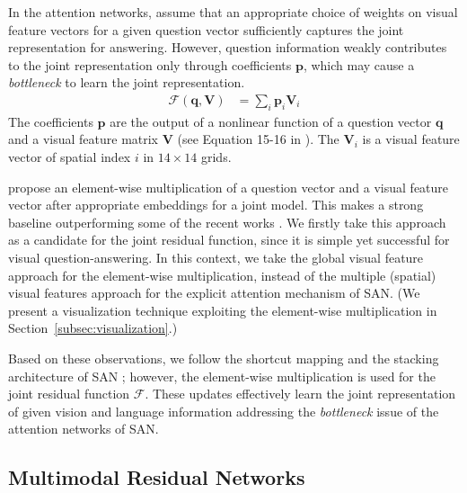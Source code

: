 \documentclass{article}
\newcommand{\vq}[0]{\mathbf{q}}
\newcommand{\vp}[0]{\mathbf{p}}
\newcommand{\mV}[0]{\mathbf{V}}
\begin{document}
In the attention networks, \citet{Yang2015} assume that an appropriate choice of weights on visual feature vectors for a given question vector sufficiently captures the joint representation for answering. However, question information weakly contributes to the joint representation only through coefficients $\vp$, which may cause a \textit{bottleneck} to learn the joint representation. \begin{align}
   \label{eq:san}
   \mathcal{F}(\vq,\mV) &= \sum_{i} \vp_{i} \mV_i
\end{align}
The coefficients $\vp$ are the output of a nonlinear function of a question vector $\vq$ and a visual feature matrix $\mV$ (see Equation 15-16 in \citet{Yang2015}). The $\mV_i$ is a visual feature vector of spatial index $i$ in $14 \times 14$ grids.

\citet{Lu2015} propose an element-wise multiplication of a question vector and a visual feature vector after appropriate embeddings for a joint model. This makes a strong baseline outperforming some of the recent works \cite{Noh2015,Andreas2016}. We firstly take this approach as a candidate for the joint residual function, since it is simple yet successful for visual question-answering. In this context, we take the global visual feature approach for the element-wise multiplication, instead of the multiple (spatial) visual features approach for the explicit attention mechanism of SAN. (We present a visualization technique exploiting the element-wise multiplication in Section~\ref{subsec:visualization}.)

Based on these observations, we follow the shortcut mapping and the stacking architecture of SAN \cite{Yang2015}; however, the element-wise multiplication is used for the joint residual function $\mathcal{F}$. These updates effectively learn the joint representation of given vision and language information addressing the \textit{bottleneck} issue of the attention networks of SAN.

\subsection{Multimodal Residual Networks}
\end{document}
